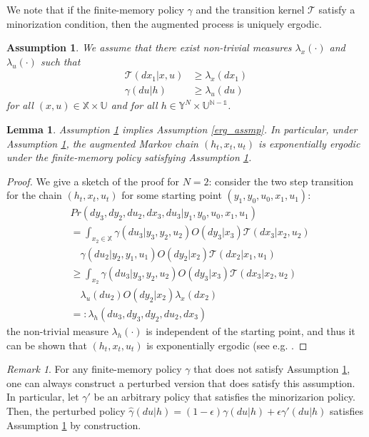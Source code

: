 \documentclass[letterpaper, 10 pt, conference]{ieeeconf}  %
\newtheorem{lemma}{Lemma}
\newtheorem{assumption}{Assumption}
\theoremstyle{definition}
\theoremstyle{remark}
\newtheorem*{remark}{Remark}
\begin{document}
We  note that if the finite-memory policy $\gamma$ and the transition kernel $\mathcal{T}$ satisfy a minorization condition, then the augmented process is uniquely ergodic.
\begin{assumption}\label{minor}
We assume that there exist non-trivial measures $\lambda_x(\cdot)$ and  $\lambda_u(\cdot)$ such that 
\begin{align*}
\mathcal{T}(dx_1|x,u)&\geq\lambda_x(dx_1)\\
\gamma(du|h)&\geq \lambda_u(du)
\end{align*}
for all $(x,u)\in\mathds{X}\times\mathds{U}$ and for all $h\in \mathds{Y}^{N}\times \mathds{U^{N-1}}$.
\end{assumption}
\begin{lemma}
Assumption \ref{minor} implies Assumption \ref{erg_assmp}. In particular, under Assumption \ref{minor}, the augmented Markov chain $(h_t,x_{t},u_t)$ is exponentially ergodic under the finite-memory policy satisfying Assumption \ref{minor}. 
\end{lemma}
\begin{proof}
We give a sketch of the proof for $N=2$: consider the two step transition for the chain $(h_t,x_{t},u_t)$ for some starting point $(y_1,y_0,u_0,x_1,u_1)$:
\begin{align*}
&Pr(dy_3, dy_2,du_2,dx_3,du_3|y_1,y_0,u_0,x_1,u_1)\\
&=\int_{x_2\in\mathds{X}} \gamma(du_3|y_3,y_2,u_2)O(dy_3|x_3)\mathcal{T}(dx_3|x_2,u_2)\\
&\quad\gamma(du_2|y_2,y_1,u_1) O(dy_2|x_2) \mathcal{T}(dx_2|x_1,u_1)\\
&\geq \int_{x_2} \gamma(du_3|y_3,y_2,u_2)O(dy_3|x_3)\mathcal{T}(dx_3|x_2,u_2)\\
&\quad\lambda_u(du_2)O(dy_2|x_2) \lambda_x(dx_2)\\
&=:\lambda_h(du_3,dy_3, dy_2,du_2,dx_3)
\end{align*}
the non-trivial measure $\lambda_h(\cdot)$  is independent of the starting point, and thus it can be shown that $(h_t,x_{t},u_t)$ is exponentially ergodic (see e.g.  \cite[Lemma 3.3]{hernandez2012adaptive}.
\end{proof}
\begin{remark}
For any finite-memory policy $\gamma$ that does not satisfy Assumption \ref{minor}, one can always construct a perturbed version that does satisfy this assumption. In particular, let $\gamma'$ be an arbitrary policy that satisfies the minorizarion policy. Then, the perturbed policy $\hat{\gamma}(du|h)=(1-\epsilon)\gamma(du|h)+\epsilon \gamma'(du|h)$ satisfies Assumption \ref{minor} by construction.
\end{remark}
\end{document}
